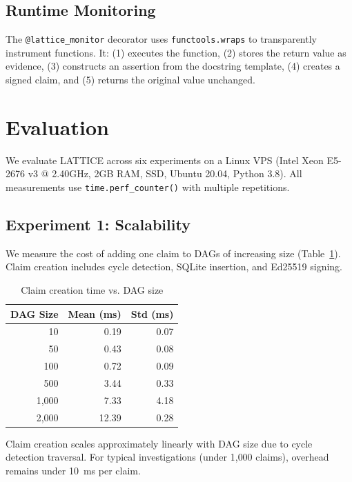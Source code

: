 \documentclass[11pt,twocolumn]{article}
\begin{document}
\subsection{Runtime Monitoring}

The \texttt{@lattice\_monitor} decorator uses \texttt{functools.wraps} to transparently instrument functions. It: (1) executes the function, (2) stores the return value as evidence, (3) constructs an assertion from the docstring template, (4) creates a signed claim, and (5) returns the original value unchanged.

\section{Evaluation}
\label{sec:evaluation}

We evaluate LATTICE across six experiments on a Linux VPS (Intel Xeon E5-2676 v3 @ 2.40GHz, 2GB RAM, SSD, Ubuntu 20.04, Python 3.8). All measurements use \texttt{time.perf\_counter()} with multiple repetitions.

\subsection{Experiment 1: Scalability}

We measure the cost of adding one claim to DAGs of increasing size (Table~\ref{tab:scalability}). Claim creation includes cycle detection, SQLite insertion, and Ed25519 signing.

\begin{table}[H]
\centering
\caption{Claim creation time vs. DAG size}
\label{tab:scalability}
\begin{tabular}{@{}rrr@{}}
\toprule
\textbf{DAG Size} & \textbf{Mean (ms)} & \textbf{Std (ms)} \\
\midrule
10 & 0.19 & 0.07 \\
50 & 0.43 & 0.08 \\
100 & 0.72 & 0.09 \\
500 & 3.44 & 0.33 \\
1{,}000 & 7.33 & 4.18 \\
2{,}000 & 12.39 & 0.28 \\
\bottomrule
\end{tabular}
\end{table}

Claim creation scales approximately linearly with DAG size due to cycle detection traversal. For typical investigations (under 1{,}000 claims), overhead remains under 10~ms per claim.
\end{document}
